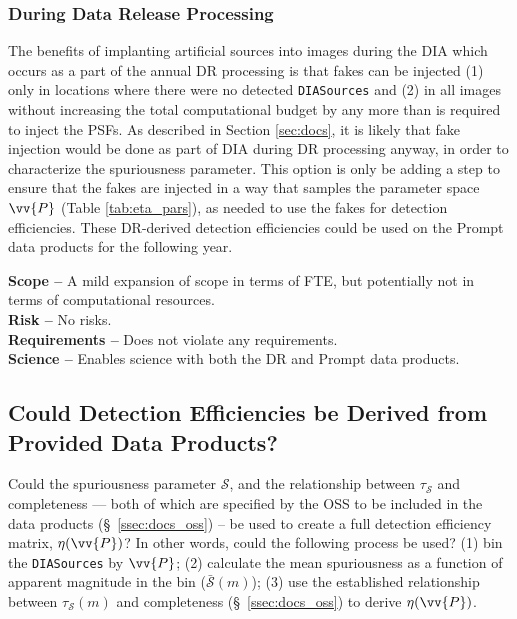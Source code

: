\subsubsection{During Data Release Processing}\label{sssec:opts_fakeswhen_DR}

The benefits of implanting artificial sources into images during the DIA which occurs as a part of the annual DR processing is that fakes can be injected (1) only in locations where there were no detected {\tt DIASources} and (2) in all images without increasing the total computational budget by any more than is required to inject the PSFs. As described in Section \ref{sec:docs}, it is likely that fake injection would be done as part of DIA during DR processing anyway, in order to characterize the spuriousness parameter. This option is only be adding a step to ensure that the fakes are injected in a way that samples the parameter space $\vv{P}$ (Table \ref{tab:eta_pars}), as needed to use the fakes for detection efficiencies. These DR-derived detection efficiencies could be used on the Prompt data products for the following year. 

{\bf Scope --} A mild expansion of scope in terms of FTE, but potentially not in terms of computational resources. \\
{\bf Risk --} No risks. \\
{\bf Requirements --} Does not violate any requirements. \\
{\bf Science --} Enables science with both the DR and Prompt data products. 


\subsection{Could Detection Efficiencies be Derived from Provided Data Products?}\label{ssec:docs_derDE}

Could the spuriousness parameter $\mathcal{S}$, and the relationship between $\tau_{\mathcal{S}}$ and completeness --- both of which are specified by the OSS to be included in the data products (\S~\ref{ssec:docs_oss}) -- be used to create a full detection efficiency matrix, $\eta(\vv{P})$? In other words, could the following process be used? (1) bin the {\tt DIASources} by $\vv{P}$; (2) calculate the mean spuriousness as a function of apparent magnitude in the bin ($\bar{\mathcal{S}}(m)$); (3) use the established relationship between $\tau_{\mathcal{S}}(m)$ and completeness (\S~\ref{ssec:docs_oss}) to derive $\eta(\vv{P})$.

